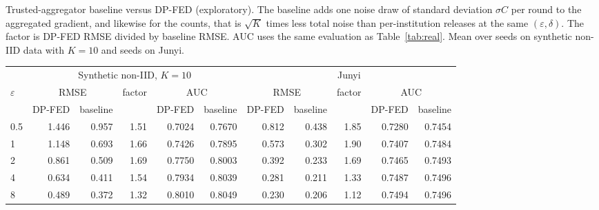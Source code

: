 \begin{widetable}
\centering
\caption{Trusted-aggregator baseline versus DP-FED (exploratory). The baseline adds one noise draw of standard deviation $\sigma C$ per round to the aggregated gradient, and likewise for the counts, that is $\sqrt{K}$ times less total noise than per-institution releases at the same $(\varepsilon,\delta)$. The factor is DP-FED RMSE divided by baseline RMSE. AUC uses the same evaluation as Table~\ref{tab:real}. Mean over \NSeeds{} seeds on synthetic non-IID data with $K=10$ and \ExSeedsJunyi{} seeds on Junyi.}
\label{tab:fedirtdp}
\footnotesize\setlength{\tabcolsep}{4pt}
\begin{tabular}{l rrr rr rrr rr}
\toprule
& \multicolumn{5}{c}{Synthetic non-IID, $K=10$} & \multicolumn{5}{c}{Junyi} \\
\cmidrule(lr){2-6}\cmidrule(lr){7-11}
$\varepsilon$ & \multicolumn{2}{c}{RMSE} & factor & \multicolumn{2}{c}{AUC} & \multicolumn{2}{c}{RMSE} & factor & \multicolumn{2}{c}{AUC} \\
& DP-FED & baseline & & DP-FED & baseline & DP-FED & baseline & & DP-FED & baseline \\
\midrule
0.5 & 1.446 & 0.957 & 1.51 & 0.7024 & 0.7670 & 0.812 & 0.438 & 1.85 & 0.7280 & 0.7454 \\
1 & 1.148 & 0.693 & 1.66 & 0.7426 & 0.7895 & 0.573 & 0.302 & 1.90 & 0.7407 & 0.7484 \\
2 & 0.861 & 0.509 & 1.69 & 0.7750 & 0.8003 & 0.392 & 0.233 & 1.69 & 0.7465 & 0.7493 \\
4 & 0.634 & 0.411 & 1.54 & 0.7934 & 0.8039 & 0.281 & 0.211 & 1.33 & 0.7487 & 0.7496 \\
8 & 0.489 & 0.372 & 1.32 & 0.8010 & 0.8049 & 0.230 & 0.206 & 1.12 & 0.7494 & 0.7496 \\
\bottomrule
\end{tabular}
\end{widetable}
